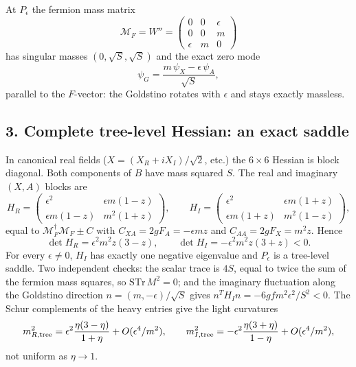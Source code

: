 \documentclass[11pt]{article}
\begin{document}
At $P_\epsilon$ the fermion mass matrix
\begin{equation}
\mathcal M_F=W''=\begin{pmatrix}0&0&\epsilon\\0&0&m\\\epsilon&m&0\end{pmatrix}
\end{equation}
has singular masses $(0,\sqrt S,\sqrt S)$ and the exact zero mode
\begin{equation}
\psi_G=\frac{m\,\psi_X-\epsilon\,\psi_A}{\sqrt S},
\end{equation}
parallel to the $F$-vector: the Goldstino rotates with $\epsilon$ and stays
exactly massless.

\subsection*{3. Complete tree-level Hessian: an exact saddle}

In canonical real fields ($X=(X_R+iX_I)/\sqrt2$, etc.) the $6\times6$
Hessian is block diagonal. Both components of $B$ have mass squared $S$.
The real and imaginary $(X,A)$ blocks are
\begin{equation}
H_R=\begin{pmatrix}\epsilon^2&\epsilon m(1-z)\\\epsilon m(1-z)&m^2(1+z)\end{pmatrix},\qquad
H_I=\begin{pmatrix}\epsilon^2&\epsilon m(1+z)\\\epsilon m(1+z)&m^2(1-z)\end{pmatrix},
\end{equation}
equal to $\mathcal M_F^\dagger\mathcal M_F\pm C$ with $C_{XA}=2gF_A=-\epsilon mz$
and $C_{AA}=2gF_X=m^2z$. Hence
\begin{equation}
\det H_R=\epsilon^2m^2z(3-z),\qquad \det H_I=-\epsilon^2m^2z(3+z)<0 .
\end{equation}
For every $\epsilon\neq0$, $H_I$ has exactly one negative eigenvalue and
$P_\epsilon$ is a tree-level saddle. Two independent checks: the scalar
trace is $4S$, equal to twice the sum of the fermion mass squares, so
$\mathrm{STr}\,M^2=0$; and the imaginary fluctuation along the Goldstino
direction $n=(m,-\epsilon)/\sqrt S$ gives
$n^TH_In=-6gfm^2\epsilon^2/S^2<0$. The Schur complements of the heavy
entries give the light curvatures
\begin{equation}
m^2_{R,\rm tree}=\epsilon^2\frac{\eta(3-\eta)}{1+\eta}+O(\epsilon^4/m^2),\qquad
m^2_{I,\rm tree}=-\epsilon^2\frac{\eta(3+\eta)}{1-\eta}+O(\epsilon^4/m^2),
\end{equation}
not uniform as $\eta\to1$.
\end{document}
